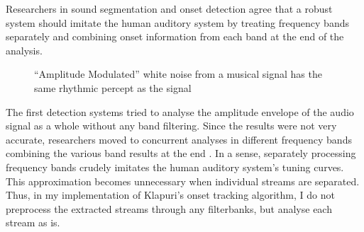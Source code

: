 Researchers in sound segmentation and onset detection agree that
a robust system should imitate the human auditory system by treating
frequency bands separately and combining onset information from each
band at the end of the analysis. 
\begin{figure}[thp]
  \begin{center}
    \caption{``Amplitude Modulated'' white noise from a musical signal
      has the same rhythmic percept as the signal}
    \label{AMod}
  \end{center}
\end{figure}
The first detection systems tried to analyse the amplitude envelope of
the audio signal as a whole without any band filtering.  Since the
results were not very accurate, researchers moved to concurrent
analyses in different frequency bands combining the various
band results at the end \cite{Klapuri:99}\cite{Scheirer:98tempo}.
In a sense, separately processing frequency bands crudely imitates the human
auditory system's tuning curves. This approximation becomes
unnecessary when individual streams are separated. Thus, in my
implementation of Klapuri's onset tracking algorithm, I do not preprocess
the extracted streams through any filterbanks, but analyse each stream as is.  

